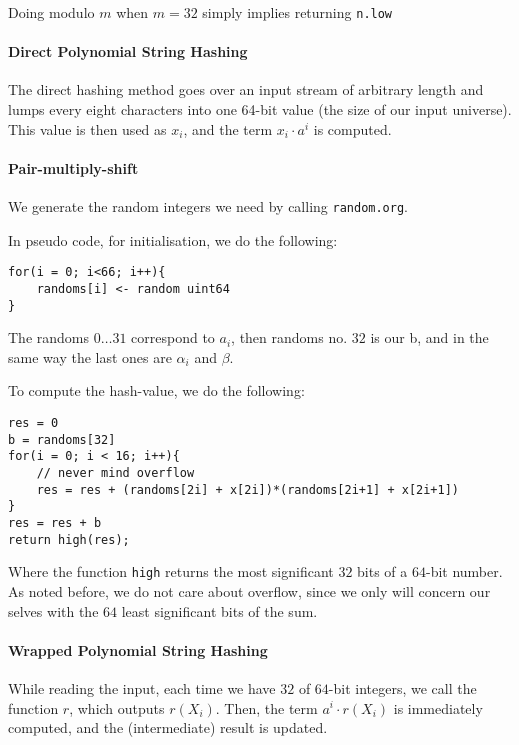 \documentclass[]{article}
\newcommand{\funk}[1]{\small\texttt{#1}}
\begin{document}
Doing modulo $m$ when $m = 32$ simply implies returning \funk{n.low}

\paragraph{Direct Polynomial String Hashing}

The direct hashing method goes over an input stream of arbitrary length and lumps every eight characters into one 64-bit value (the size of our input universe). This value is then used as $x_i$, and the term $x_i\cdot a^i$ is computed.

\paragraph{Pair-multiply-shift} 

We generate the random integers we need by calling \texttt{random.org}. 

In pseudo code, for initialisation, we do the following:

\begin{verbatim}
for(i = 0; i<66; i++){
    randoms[i] <- random uint64
}
\end{verbatim}

The randoms $0\ldots 31$ correspond to $a_i$, then randoms no. $32$ is our b, and in the same way the last ones are $\alpha_i$ and $\beta$.

To compute the hash-value, we do the following:
\begin{verbatim}
res = 0
b = randoms[32]
for(i = 0; i < 16; i++){
    // never mind overflow
    res = res + (randoms[2i] + x[2i])*(randoms[2i+1] + x[2i+1])
}
res = res + b
return high(res);
\end{verbatim}

Where the function \texttt{high} returns the most significant $32$ bits of a $64$-bit number.
As noted before, we do not care about overflow, since we only will concern our selves with the $64$ least significant bits of the sum.

\paragraph{Wrapped Polynomial String Hashing}


While reading the input, each time we have $32$ of $64$-bit integers, we call the function $r$, which outputs $r(X_i)$. Then, the term $a^i \cdot r(X_i)$ is immediately computed, and the (intermediate) result is updated.
\end{document}
